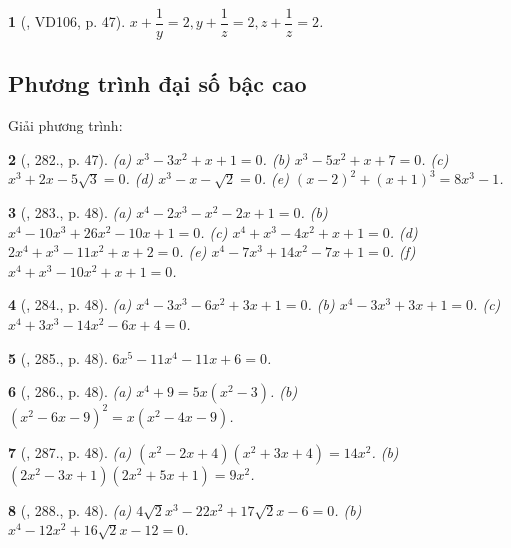\documentclass{article}
\newtheorem{baitoan}{}
\begin{document}
\begin{baitoan}[\cite{Binh_Toan_9_tap_2}, VD106, p. 47]
	$x + \dfrac{1}{y} = 2,y + \dfrac{1}{z} = 2,z + \dfrac{1}{z} = 2$.
\end{baitoan}

\subsection{Phương trình đại số bậc cao}
Giải phương trình:

\begin{baitoan}[\cite{Binh_Toan_9_tap_2}, 282., p. 47]
	(a) $x^3 - 3x^2 + x + 1 = 0$. (b) $x^3 - 5x^2 + x + 7 = 0$. (c) $x^3 + 2x - 5\sqrt{3} = 0$. (d) $x^3 - x - \sqrt{2} = 0$. (e) $(x - 2)^2 + (x + 1)^3 = 8x^3 - 1$.
\end{baitoan}

\begin{baitoan}[\cite{Binh_Toan_9_tap_2}, 283., p. 48]
	(a) $x^4 - 2x^3 - x^2 - 2x + 1 = 0$. (b) $x^4 - 10x^3 + 26x^2 - 10x + 1 = 0$. (c) $x^4 + x^3 - 4x^2 + x + 1 = 0$. (d) $2x^4 + x^3 - 11x^2 + x + 2 = 0$. (e) $x^4 - 7x^3 + 14x^2 - 7x + 1 = 0$. (f) $x^4 + x^3 - 10x^2 + x + 1 = 0$.
\end{baitoan}

\begin{baitoan}[\cite{Binh_Toan_9_tap_2}, 284., p. 48]
	(a) $x^4 - 3x^3 - 6x^2 + 3x + 1 = 0$. (b) $x^4 - 3x^3 + 3x + 1 = 0$. (c) $x^4 + 3x^3 - 14x^2 - 6x + 4 = 0$.
\end{baitoan}

\begin{baitoan}[\cite{Binh_Toan_9_tap_2}, 285., p. 48]
	$6x^5 - 11x^4 - 11x + 6 = 0$.
\end{baitoan}

\begin{baitoan}[\cite{Binh_Toan_9_tap_2}, 286., p. 48]
	(a) $x^4 + 9 = 5x(x^2 - 3)$. (b) $(x^2 - 6x - 9)^2 = x(x^2 - 4x - 9)$.
\end{baitoan}

\begin{baitoan}[\cite{Binh_Toan_9_tap_2}, 287., p. 48]
	(a) $(x^2 - 2x + 4)(x^2 + 3x + 4) = 14x^2$. (b) $(2x^2 - 3x + 1)(2x^2 + 5x + 1) = 9x^2$.
\end{baitoan}

\begin{baitoan}[\cite{Binh_Toan_9_tap_2}, 288., p. 48]
	(a) $4\sqrt{2}x^3 - 22x^2 + 17\sqrt{2}x - 6 = 0$. (b) $x^4 - 12x^2 + 16\sqrt{2}x - 12 = 0$.
\end{baitoan}
\end{document}
